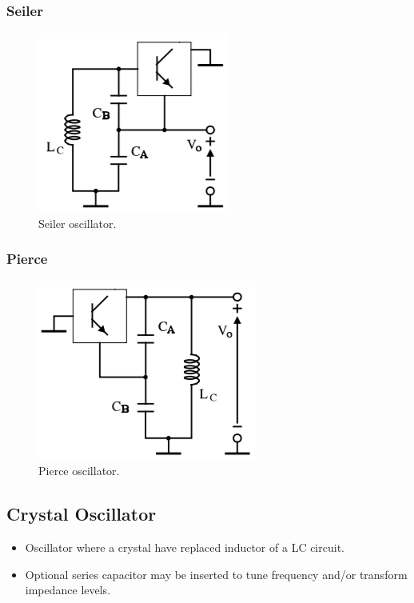 \subsubsection{Seiler}
\begin{figure} [H]
	\centering
	\includegraphics[width=0.4\linewidth]{graphics/43.png}
	\caption{Seiler oscillator.}
	\label{fig:43}
\end{figure}

\subsubsection{Pierce}
\begin{figure} [H]
	\centering
	\includegraphics[width=0.45\linewidth]{graphics/42.png}
	\caption{Pierce oscillator.}
	\label{fig:44}
\end{figure}

\subsection{Crystal Oscillator}
\begin{itemize}
	\item Oscillator where a crystal have replaced inductor of a LC circuit.
	\item Optional series capacitor may be inserted to tune	frequency and/or transform impedance levels.
\end{itemize}
